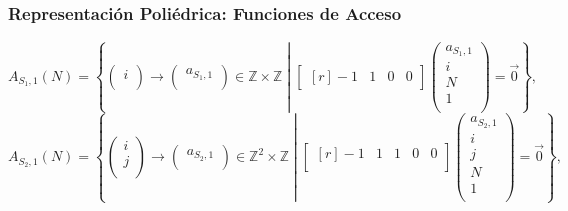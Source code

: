 \documentclass{beamer}\usetheme{Madrid} %
\begin{document}
\begin{frame}
\frametitle{Representación Poliédrica: Funciones de Acceso}
$$
{\scriptstyle
 A_{S_1,1}(N) = 
        \left\{ 
            \left(\begin{matrix}i\\\end{matrix} \right) \to 
            \left(\begin{matrix} a_{S_1,1} \\\end{matrix} \right) 
            \in \mathbb{Z} \times \mathbb{Z}  \middle|
            \begin{bmatrix*}[r] -1 & 1 & 0 & 0 \end{bmatrix*} 
            \left( \begin{array}{c} a_{S_1,1} \\ i \\ N \\ 1\\ \end{array} \right)
            = \vec{0}
        \right\},
}
$$
$$
{\scriptstyle
 A_{S_2,1}(N) = 
        \left\{ 
            \left(\begin{matrix}i \\ j \\\end{matrix} \right) \to 
            \left(\begin{matrix} a_{S_2,1} \\\end{matrix} \right) 
            \in \mathbb{Z}^2 \times \mathbb{Z}  \middle|
            \begin{bmatrix*}[r] -1 & 1 & 1 & 0 & 0 \\ \end{bmatrix*} 
            \left( \begin{array}{c} a_{S_2,1} \\ i \\ j \\ N \\ 1\\ \end{array} \right)
            = \vec{0}
        \right\},
}
$$
\end{frame}
\end{document}
